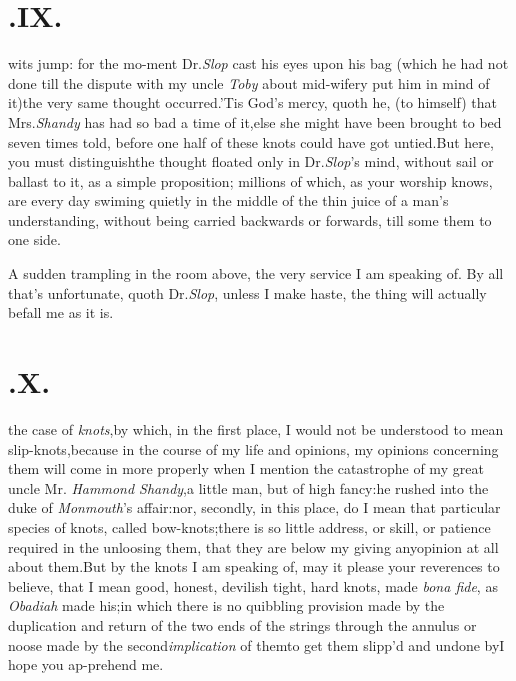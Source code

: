 \documentclass{article}
\begin{document}
\section{.\quad  IX.}

 wits jump: for the mo-\break ment Dr.\@ \textit{Slop} cast his eyes upon\break
his bag (which he
had not done till the dispute with my uncle \textit{Toby} about mid-wifery put him
in mind of it)\tsk the very same thought occurred.\tsh ’Tis God’s mercy, quoth he, (to
himself) that Mrs.\@ \textit{Shandy} has had so bad a time of it,\tsh else she might
have been brought to bed seven times told, before one half of these knots could have
got untied.\tsh But here, you must distinguish\tsh the\break
thought floated only in Dr.\@ \textit{Slop}’s mind,\break
without sail or ballast to it, as a simple proposition;
millions of which, as your worship knows, are every day swiming quietly in the
middle of the thin juice of a man’s understanding, without being carried backwards
or forwards, till some\break
{} them to one side.

A sudden trampling in the room above,  the very service I am speaking of. By
all that’s unfortunate, quoth Dr.\@ \textit{Slop}, unless I make
haste, the thing will actually befall me as it is.

\vfill{}\eject

\section{.\quad  X.}

 the case of \textit{knots},\tsh by which, in\break
the first place, I would not be under\-stood to mean slip-knots,\tsk because in the course of my life and
opinions,\tsh\break
my opinions concerning them will come in more properly when I mention the
catastrophe of my great uncle Mr.  \textit{Hammond Shandy},\tsk a little man,\tsk
but of\break
high fancy:\tsk he rushed into the duke of \textit{Monmouth}’s affair:\tsh nor,
secondly, in this place, do I mean that particular species of knots, called
bow-knots;\tsk there is so little address, or skill, or patience required in the
unloosing them, that they are below my giving any\break opinion at all about them.\tsk But
by the knots I am speaking of, may it please your reverences to believe, that I
mean
good, honest, devilish tight, hard knots, made \textit{bona fide}, as
\textit{Obadiah} made his;\tsh in which there is no quibbling provision made by the
duplication and return of the two ends of the strings through the annulus or noose
made by the second\break\textit{implication} of them\tsk to get them slipp’d and
undone by\tsh\tsh I hope you ap-\break prehend me.
\end{document}
